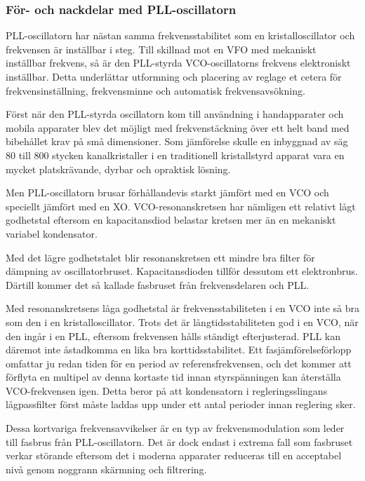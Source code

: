 \subsubsection{För- och nackdelar med PLL-oscillatorn}

PLL-oscillatorn har nästan samma frekvensstabilitet som en
kristalloscillator och frekvensen är inställbar i steg.
Till skillnad mot en VFO med mekaniskt inställbar frekvens, så är den PLL-styrda
VCO-oscillatorns frekvens elektroniskt inställbar.
Detta underlättar utformning och placering av reglage et cetera för
frekvensinställning, frekvensminne och automatisk frekvensavsökning.

Först när den PLL-styrda oscillatorn kom till användning i handapparater och
mobila apparater blev det möjligt med frekvenstäckning över ett helt band med
bibehållet krav på små dimensioner.
Som jämförelse skulle en inbyggnad av säg 80 till 800 stycken kanalkristaller
i en traditionell kristallstyrd apparat vara en mycket platskrävande, dyrbar
och opraktisk lösning.

Men PLL-oscillatorn brusar förhållandevis starkt jämfört med en VCO och
speciellt jämfört med en XO.
VCO-resonanskretsen har nämligen ett relativt lågt godhetstal eftersom en
kapacitansdiod belastar kretsen mer än en mekaniskt variabel kondensator.

Med det lägre godhetstalet blir resonanskretsen ett mindre bra
filter för dämpning av oscillatorbruset.
Kapacitansdioden tillför dessutom ett elektronbrus.
Därtill kommer det så kallade fasbruset från frekvensdelaren och PLL.

Med resonanskretsens låga godhetstal är frekvensstabiliteten i en VCO inte så
bra som den i en kristalloscillator.
Trots det är långtidsstabiliteten god i en VCO, när den ingår i en PLL,
eftersom frekvensen hålls ständigt efterjusterad.
PLL kan däremot inte åstadkomma en lika bra korttidsstabilitet.
Ett fasjämförelseförlopp omfattar ju redan tiden för en period av
referensfrekvensen, och det kommer att förflyta en multipel av denna kortaste 
tid innan styrspänningen kan återställa VCO-frekvensen igen.
Detta beror på att kondensatorn i regleringsslingans lågpassfilter först måste
laddas upp under ett antal perioder innan reglering sker.

Dessa kortvariga frekvensavvikelser är en typ av frekvensmodulation
som leder till fasbrus från PLL-oscillatorn.
Det är dock endast i extrema fall som fasbruset verkar störande eftersom det
i moderna apparater reduceras till en acceptabel nivå genom noggrann
skärmning och filtrering.

